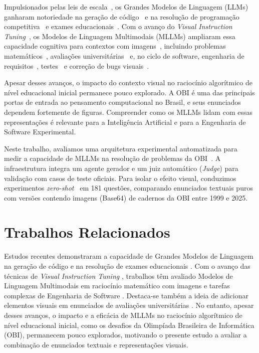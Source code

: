 \documentclass[sigconf]{acmart}
\begin{document}
Impulsionados pelas leis de escala~\cite{kaplan2020scaling}, os Grandes Modelos de Linguagem (LLMs) ganharam notoriedade na geração de código~\cite{Chen:2021:ELL} e na resolução de programação competitiva~\cite{Zheng2025LiveCodeBenchPH} e exames educacionais~\cite{Viegas2025AssessingTC, Mendona2024EvaluatingCV, nunes2023evaluating}. Com o avanço do \textit{Visual Instruction Tuning}~\cite{Liu2023VisualIT}, os Modelos de Linguagem Multimodais (MLLMs) ampliaram essa capacidade cognitiva para contextos com imagens~\cite{Fu2023MMEAC}, incluindo problemas matemáticos~\cite{Lu2023MathVistaEM}, avaliações universitárias~\cite{Almeida2023BLUEXAB, Yue2023MMMUAM} e, no ciclo de software, engenharia de requisitos~\cite{Mendoza2024Comparative}, testes~\cite{Silva2025LLMs} e correção de bugs visuais~\cite{Yang2024SWEbenchMD}.

Apesar desses avanços, o impacto do contexto visual no raciocínio algorítmico de nível educacional inicial permanece pouco explorado. A OBI é uma das principais portas de entrada ao pensamento computacional no Brasil, e seus enunciados dependem fortemente de figuras. Compreender como os MLLMs lidam com essas representações é relevante para a Inteligência Artificial e para a Engenharia de Software Experimental.

Neste trabalho, avaliamos uma arquitetura experimental automatizada para medir a capacidade de MLLMs na resolução de problemas da OBI~\cite{obi_passadas}. A infraestrutura integra um agente gerador e um juiz automático (\textit{Judge}) para validação com casos de teste oficiais. Para isolar o efeito visual, conduzimos experimentos \textit{zero-shot}~\cite{wei2021finetuned} em 181 questões, comparando enunciados textuais puros com versões contendo imagens (Base64) de cadernos da OBI entre 1999 e 2025.


\section{Trabalhos Relacionados}
Estudos recentes demonstraram a capacidade de Grandes Modelos de Linguagem na geração de código \cite{Chen:2021:ELL, Zheng2025LiveCodeBenchPH} e na resolução de exames educacionais \cite{Viegas2025AssessingTC, Mendona2024EvaluatingCV}. Com o avanço das técnicas de \textit{Visual Instruction Tuning} \cite{Liu2023VisualIT}, trabalhos têm avaliado Modelos de Linguagem Multimodais em raciocínio matemático com imagens \cite{Lu2023MathVistaEM} e tarefas complexas de Engenharia de Software \cite{Mendoza2024Comparative, Yang2024SWEbenchMD}. Destaca-se também a ideia de adicionar elementos visuais em enunciados de avaliações universitárias \cite{Almeida2023BLUEXAB}. No entanto, apesar desses avanços, o impacto e a eficácia de MLLMs no raciocínio algorítmico de nível educacional inicial, como os desafios da Olimpíada Brasileira de Informática (OBI), permanecem pouco explorados, motivando o presente estudo a avaliar a combinação de enunciados textuais e representações visuais.
\end{document}
